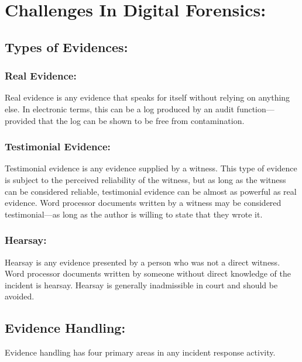 \documentclass[british]{article}
\begin{document}
\vfill{}


\section{Challenges In Digital Forensics:}

\subsection{Types of Evidences:}

\subsubsection{Real Evidence:}

Real evidence is any evidence that speaks for itself without relying
on anything else. In electronic terms, this can be a log produced
by an audit function---provided that the log can be shown to be free
from contamination.

\subsubsection{Testimonial Evidence:}

Testimonial evidence is any evidence supplied by a witness. This type
of evidence is subject to the perceived reliability of the witness,
but as long as the witness can be considered reliable, testimonial
evidence can be almost as powerful as real evidence. Word processor
documents written by a witness may be considered testimonial---as
long as the author is willing to state that they wrote it.

\subsubsection{Hearsay:}

Hearsay is any evidence presented by a person who was not a direct
witness. Word processor documents written by someone without direct
knowledge of the incident is hearsay. Hearsay is generally inadmissible
in court and should be avoided.

\vfill{}


\subsection{Evidence Handling:}

Evidence handling has four primary areas in any incident response
activity.
\end{document}
